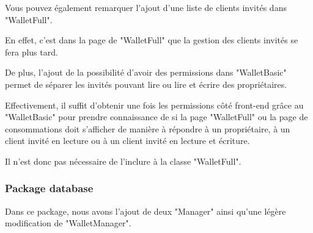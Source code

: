 \begin{flushleft}
Vous pouvez également remarquer l'ajout d'une liste de clients invités dans "WalletFull".
\end{flushleft}

\begin{flushleft}
En effet, c'est dans la page de "WalletFull" que la gestion des clients invités se fera plus tard.
\end{flushleft}

\begin{flushleft}
De plus, l'ajout de la possibilité d'avoir des permissions dans "WalletBasic" permet de séparer les invités pouvant lire ou lire et écrire des propriétaires.
\end{flushleft}

\begin{flushleft}
Effectivement, il suffit d'obtenir une fois les permissions côté front-end grâce au "WalletBasic" pour prendre connaissance de si la page "WalletFull" ou la page de consommations doit s'afficher de manière à répondre à un propriétaire, à un client invité en lecture ou à un client invité en lecture et écriture.
\end{flushleft}

\begin{flushleft}
Il n'est donc pas nécessaire de l'inclure à la classe "WalletFull".
\end{flushleft}

\subsubsection{Package database}

\begin{flushleft}
Dans ce package, nous avons l'ajout de deux "Manager" ainsi qu'une légère modification de "WalletManager".
\end{flushleft}

